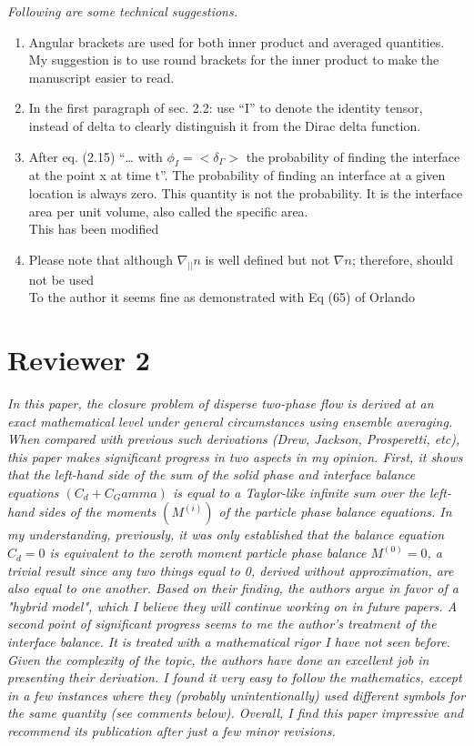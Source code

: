 \documentclass[10pt,a4paper]{article}
\newcommand{\tb}[1]{\color{blue}#1\color{black}}
\newcommand{\tr}[1]{\color{red}#1\color{black}}
\begin{document}
\textit{Following are some technical suggestions.}


\begin{enumerate}
    \item Angular brackets are used for both inner product and averaged quantities. My suggestion is to use round brackets for the inner product to make the manuscript easier to read.
    \item In the first paragraph of sec. 2.2: use “I” to denote the identity tensor, instead of delta to
    clearly distinguish it from the Dirac delta function.
    \item After eq. (2.15) “… with $\phi_I = <\delta_\Gamma>$ the probability of finding the interface at the point x at
    time t”. The probability of finding an interface at a given location is always zero. This
    quantity is not the probability. It is the interface area per unit volume, also called the specific
    area.\\
    \tb{This has been modified}
    \item Please note that although $\nabla_{||} n$ is well defined but not $\nabla n$; therefore, should not be used
    \\
    \tr{To the author it seems fine as demonstrated with Eq (65) of Orlando }
\end{enumerate}


\section*{Reviewer 2}

\textit{In this paper, the closure problem of disperse two-phase flow is derived at an exact mathematical level under general circumstances using ensemble averaging. When compared with previous such derivations (Drew, Jackson, Prosperetti, etc), this paper makes significant progress in two aspects in my opinion. First, it shows that the left-hand side of the sum of the solid phase and interface balance equations $(C_d+C_Gamma)$ is equal to a Taylor-like infinite sum over the left-hand sides of the moments $(M^(i))$ of the particle phase balance equations. In my understanding, previously, it was only established that the balance equation $C_d =0$ is equivalent to the zeroth moment particle phase balance $M^(0)=0$, a trivial result since any two things equal to 0, derived without approximation, are also equal to one another. Based on their finding, the authors argue in favor of a "hybrid model", which I believe they will continue working on in future papers. A second point of significant progress seems to me the author's treatment of the interface balance. It is treated with a mathematical rigor I have not seen before.
Given the complexity of the topic, the authors have done an excellent job in presenting their derivation. I found it very easy to follow the mathematics, except in a few instances where they (probably unintentionally) used different symbols for the same quantity (see comments below). Overall, I find this paper impressive and recommend its publication after just a few minor revisions.}
\end{document}
